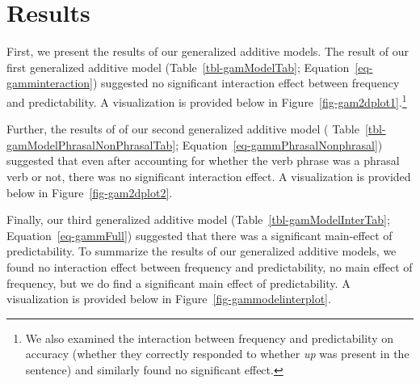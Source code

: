 \documentclass[
  authoryear,
  preprint,
  1p,
  onecolumn]{elsarticle}
\begin{document}
\section{Results}\label{results}

First, we present the results of our generalized additive models. The
result of our first generalized additive model
(Table~\ref{tbl-gamModelTab}; Equation~\ref{eq-gamminteraction})
suggested no significant interaction effect between frequency and
predictability. A visualization is provided below in
Figure~\ref{fig-gam2dplot1}.\footnote{We also examined the interaction
  between frequency and predictability on accuracy (whether they
  correctly responded to whether \emph{up} was present in the sentence)
  and similarly found no significant effect.}

Further, the results of of our second generalized additive model (
Table~\ref{tbl-gamModelPhrasalNonPhrasalTab};
Equation~\ref{eq-gammPhrasalNonphrasal}) suggested that even after
accounting for whether the verb phrase was a phrasal verb or not, there
was no significant interaction effect. A visualization is provided below
in Figure~\ref{fig-gam2dplot2}.

Finally, our third generalized additive model
(Table~\ref{tbl-gamModelInterTab}; Equation~\ref{eq-gammFull}) suggested
that there was a significant main-effect of predictability. To summarize
the results of our generalized additive models, we found no interaction
effect between frequency and predictability, no main effect of
frequency, but we do find a significant main effect of predictability. A
visualization is provided below in Figure~\ref{fig-gammodelinterplot}.

\begin{table}

\caption{\label{tbl-gamModelTab}Model results for the generalized
Additive Mixed Model cotanining only the interaction between frequency
and predictability.}


\end{table}%
\end{document}
